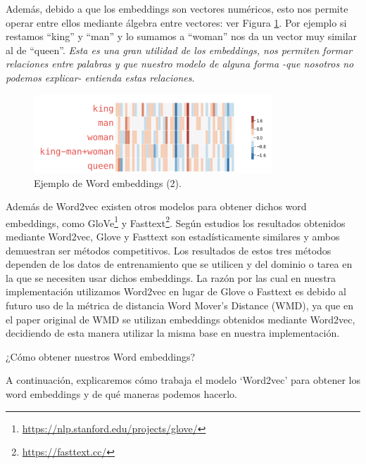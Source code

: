 \documentclass[12pt,a4paper]{article}
\makeatletter
\renewcommand\paragraph{\@startsection{paragraph}{4}{\z@}
            {-2.5ex\@plus -1ex \@minus -.25ex}
            {1.25ex \@plus .25ex}
            {\normalfont\normalsize\bfseries}}
\makeatother
\begin{document}
\begin{sloppypar}
Además, debido a que los embeddings son vectores numéricos, esto nos permite operar entre ellos mediante álgebra entre vectores: ver Figura \ref{fig:Imagen_NLP_14}. Por ejemplo si restamos “king” y “man” y lo sumamos a “woman” nos da un vector muy similar al de “queen”. \textit{Esta es una gran utilidad de los embeddings, nos permiten formar relaciones entre palabras y que nuestro modelo de alguna forma -que nosotros no podemos explicar- entienda estas relaciones}.

\begin{figure}[H]    
 \centering
 \includegraphics[width=0.8\textwidth]{images/NLP/14.png}
 \caption{Ejemplo de Word embeddings (2)\cite{datitos_nlp}.}
 \label{fig:Imagen_NLP_14}
\end{figure}

Además de Word2vec existen otros modelos para obtener dichos word embeddings, como GloVe\footnote{\url{https://nlp.stanford.edu/projects/glove/}} y Fasttext\footnote{\url{https://fasttext.cc/}}. Según estudios\cite{NLP_12, NLP_13} los resultados obtenidos mediante Word2vec, Glove y Fasttext son estadísticamente similares y ambos demuestran ser métodos competitivos. Los resultados de estos tres métodos dependen de los datos de entrenamiento que se utilicen y del dominio o tarea en la que se necesiten usar dichos embeddings. La razón por las cual en nuestra implementación utilizamos Word2vec en lugar de Glove o Fasttext es debido al futuro uso de la métrica de distancia Word Mover's Distance (WMD), ya que en el paper original de WMD\cite{wmd_paper} se utilizan embeddings obtenidos mediante Word2vec, decidiendo de esta manera utilizar la misma base en nuestra implementación.

\cleardoublepage

\paragraph{¿Cómo obtener nuestros Word embeddings?}\label{obt_word_emb}

A continuación, explicaremos cómo trabaja el modelo ‘Word2vec’ para obtener los word embeddings y de qué maneras podemos hacerlo\cite{NLP_26}.


\end{sloppypar}
\end{document}
